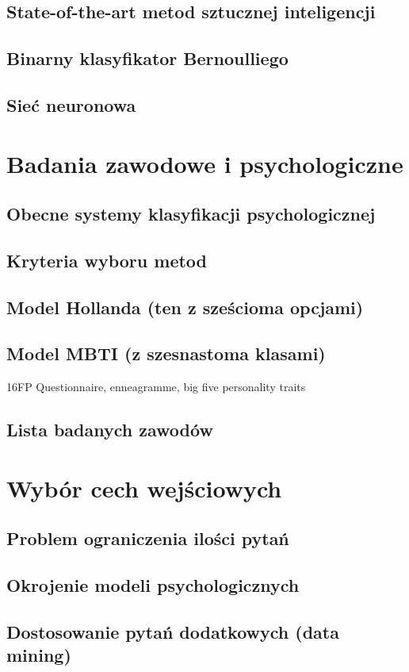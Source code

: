 \documentclass[12pt,a4paper,oneside]{report} %
\begin{document}
\subsection{State-of-the-art metod sztucznej inteligencji}
\subsection{Binarny klasyfikator Bernoulliego}
\subsection{Sieć neuronowa}
\section{Badania zawodowe i psychologiczne}
\subsection{Obecne systemy klasyfikacji psychologicznej}
\subsection{Kryteria wyboru metod}
\subsection{Model Hollanda (ten z sześcioma opcjami)}
\subsection{Model MBTI (z szesnastoma klasami)}
16FP Questionnaire, enneagramme, big five personality traits
\subsection{Lista badanych zawodów}
\section{Wybór cech wejściowych}
\subsection{Problem ograniczenia ilości pytań}
\subsection{Okrojenie modeli psychologicznych}
\subsection{Dostosowanie pytań dodatkowych (data mining)}
\end{document}
